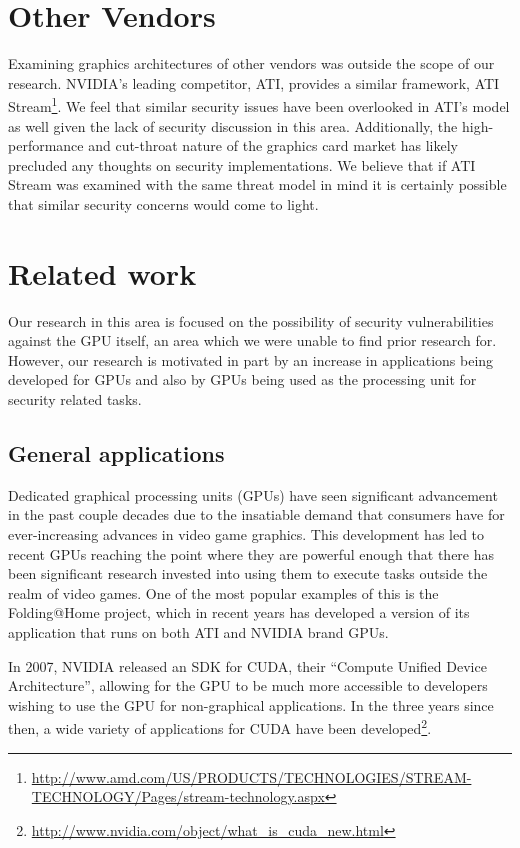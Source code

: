 \documentclass[letterpaper,10pt]{article}
\begin{document}
\begin{multicols}{2}
\section{Other Vendors}
Examining graphics architectures of other vendors was outside the scope of our research.  NVIDIA's leading competitor, ATI, provides a similar framework, ATI Stream\footnote{\url{http://www.amd.com/US/PRODUCTS/TECHNOLOGIES/STREAM-TECHNOLOGY/Pages/stream-technology.aspx}}.  We feel that similar security issues have been overlooked in ATI's model as well given the lack of security discussion in this area.  Additionally, the high-performance and cut-throat nature of the graphics card market has likely precluded any thoughts on security implementations.  We believe that if ATI Stream was examined with the same threat model in mind it is certainly possible that similar security concerns would come to light.

\section{Related work}
Our research in this area is focused on the possibility of security
vulnerabilities against the GPU itself, an area which we were unable to find
prior research for. However, our research is motivated in part by an increase
in applications being developed for GPUs and also by GPUs being used as the
processing unit for security related tasks.
  
\subsection{General applications}
  
  Dedicated graphical processing units (GPUs) have seen significant advancement
in the past couple decades due to the insatiable demand that consumers have for
ever-increasing advances in video game graphics. This development has led to
recent GPUs reaching the point where they are powerful enough that there has
been significant research invested into using them to execute tasks outside the
realm of video games. One of the most popular examples of this is the
Folding@Home project, which in recent years has developed a version of its
application that runs on both ATI and NVIDIA brand GPUs\cite{foldingathome}.
  
  In 2007, NVIDIA released an SDK for CUDA, their ``Compute Unified Device
Architecture'', allowing for the GPU to be much more accessible to developers
wishing to use the GPU for non-graphical applications. In the three years since
then, a wide variety of applications for CUDA have been developed\footnote{\url{http://www.nvidia.com/object/what\_is\_cuda\_new.html}}.
  

\end{multicols}
\end{document}
